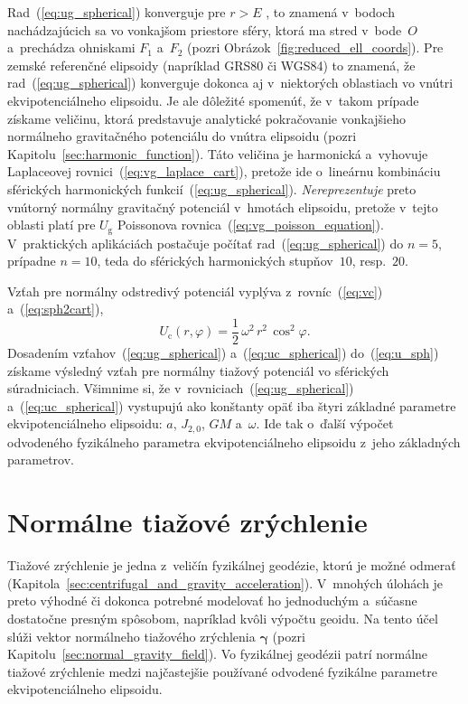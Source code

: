 \documentclass[a4paper,12pt]{book}
\newcommand{\gidx}{\mathrm g}
\newcommand{\cidx}{\mathrm c}
\begin{document}
Rad~(\ref{eq:ug_spherical}) konverguje pre $r > E$ 
\parencite{MoritzAdvancedGeodesy}, to znamená v~bodoch nachádzajúcich sa vo 
vonkajšom priestore sféry, ktorá ma stred v~bode~$O$ a~prechádza ohniskami 
$F_1$ a~$F_2$ (pozri Obrázok~\ref{fig:reduced_ell_coords}).  Pre zemské 
referenčné elipsoidy (napríklad GRS80 či WGS84) to znamená, že 
rad~(\ref{eq:ug_spherical}) konverguje dokonca aj v~niektorých oblastiach vo 
vnútri ekvipotenciálneho elipsoidu.  Je ale dôležité spomenúť, že v~takom 
prípade získame veličinu, ktorá predstavuje analytické pokračovanie vonkajšieho 
normálneho gravitačného potenciálu do vnútra elipsoidu (pozri 
Kapitolu~\ref{sec:harmonic_function}).  Táto veličina je harmonická a~vyhovuje 
Laplaceovej rovnici~(\ref{eq:vg_laplace_cart}), pretože ide o~lineárnu 
kombináciu sférických harmonických funkcií~(\ref{eq:ug_spherical}).  
\emph{Nereprezentuje} preto vnútorný normálny gravitačný potenciál v~hmotách 
elipsoidu, pretože v~tejto oblasti platí pre $U_\gidx$ Poissonova 
rovnica~(\ref{eq:vg_poisson_equation}).  V~praktických aplikáciách postačuje 
počítať rad~(\ref{eq:ug_spherical}) do $n = 5$, prípadne $n = 10$, teda do 
sférických harmonických stupňov~$10$, resp.~$20$.

Vzťah pre normálny odstredivý potenciál vyplýva z~rovníc~(\ref{eq:vc}) 
a~(\ref{eq:sph2cart}),
%
\begin{equation}
\label{eq:uc_spherical}
U_\cidx(r, \varphi) = \frac{1}{2} \, \omega^2 \, r^2 \, \cos^2\varphi{.}
\end{equation}
%
Dosadením vzťahov~(\ref{eq:ug_spherical}) a~(\ref{eq:uc_spherical}) 
do~(\ref{eq:u_sph}) získame výsledný vzťah pre normálny tiažový potenciál vo 
sférických súradniciach.  Všimnime si, že v~rovniciach~(\ref{eq:ug_spherical}) 
a~(\ref{eq:uc_spherical}) vystupujú ako konštanty opäť iba štyri základné 
parametre ekvipotenciálneho elipsoidu: $a$, $J_{2,0}$, $GM$ a~$\omega$.  Ide 
tak o~ďalší výpočet odvodeného fyzikálneho parametra ekvipotenciálneho 
elipsoidu z~jeho základných parametrov.



\section{Normálne tiažové zrýchlenie}
\label{sec:normal_gravity}

Tiažové zrýchlenie je jedna z~veličín fyzikálnej geodézie, ktorú je možné 
odmerať (Kapitola~\ref{sec:centrifugal_and_gravity_acceleration}).  V~mnohých 
úlohách je preto výhodné či dokonca potrebné modelovať ho jednoduchým a~súčasne 
dostatočne presným spôsobom, napríklad kvôli výpočtu geoidu.  Na tento účel 
slúži vektor normálneho tiažového zrýchlenia $\boldsymbol\gamma$ (pozri 
Kapitolu~\ref{sec:normal_gravity_field}).  Vo fyzikálnej geodézii patrí 
normálne tiažové zrýchlenie medzi najčastejšie používané odvodené fyzikálne 
parametre ekvipotenciálneho elipsoidu.
\end{document}
